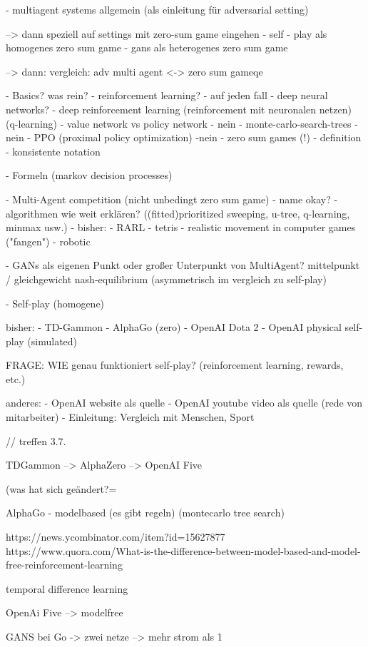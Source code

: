 - multiagent systems allgemein (als einleitung für adversarial setting)

--> dann speziell auf settings mit zero-sum game eingehen
- self - play als homogenes zero sum game
- gans als heterogenes zero sum game

--> dann: vergleich: adv multi agent <-> zero sum gameqe 


- Basics?
was rein?
	- reinforcement learning? - auf jeden fall
    - deep neural networks? - deep reinforcement learning (reinforcement mit neuronalen netzen) (q-learning)
    - value network vs policy network - nein
    - monte-carlo-search-trees - nein
    - PPO (proximal policy optimization) -nein
    - zero sum games (!) - definition - konsistente notation 
    
    - Formeln (markov decision processes)
    

- Multi-Agent competition (nicht unbedingt zero sum game)
	- name okay?
    - algorithmen wie weit erklären? ((fitted)prioritized sweeping, u-tree, q-learning, minmax usw.)
    - bisher:
    	- RARL
        - tetris
        - realistic movement in computer games ("fangen")
        - robotic

- GANs als eigenen Punkt oder großer Unterpunkt von MultiAgent? mittelpunkt / gleichgewicht nash-equilibrium (asymmetrisch im vergleich zu self-play)

- Self-play (homogene)

bisher:
	- TD-Gammon
    - AlphaGo (zero)
    - OpenAI Dota 2
    - OpenAI physical self-play (simulated)
    
    FRAGE: WIE genau funktioniert self-play? (reinforcement learning, rewards, etc.)
    
anderes:
	- OpenAI website als quelle
    - OpenAI youtube video als quelle (rede von mitarbeiter)
    - Einleitung: Vergleich mit Menschen, Sport
    
    
    
    
    // treffen 3.7.
    
    TDGammon --> AlphaZero --> OpenAI Five
    
    (was hat sich geändert?=
    
    
    AlphaGo - modelbased  (es gibt regeln) (montecarlo tree search)
    
    https://news.ycombinator.com/item?id=15627877
    https://www.quora.com/What-is-the-difference-between-model-based-and-model-free-reinforcement-learning
    
    temporal difference learning
    
    OpenAi Five --> modelfree
    
    GANS bei Go -> zwei netze --> mehr strom als 1
    
    